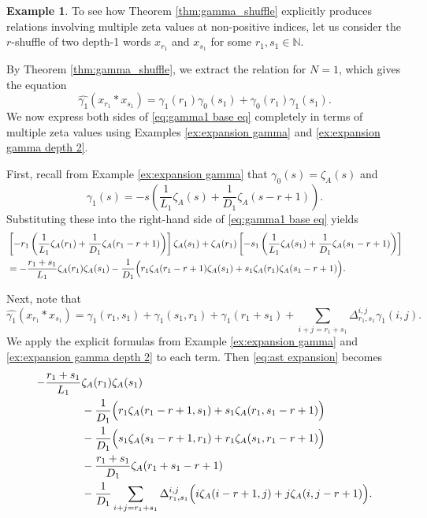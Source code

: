 \documentclass[12pt,reqno]{amsart}
\numberwithin{equation}{section}
\theoremstyle{plain}
\theoremstyle{definition}
\newtheorem{ex}[thm]{Example}
\theoremstyle{remark}
\newcommand{\NN}{\mathbb{N}}
\begin{document}
\begin{ex}\label{ex:gamma shuffle detailed}
To see how Theorem \ref{thm:gamma_shuffle} explicitly produces relations involving multiple zeta values at non-positive indices, let us consider the $r$-shuffle of two depth-1 words $x_{r_1}$ and $x_{s_1}$ for some $r_1,s_1\in\NN$. 

By Theorem \ref{thm:gamma_shuffle}, we extract the relation for $N=1$, which gives the equation
\begin{equation}\label{eq:gamma1 base eq}
    \widehat{\gamma_1}(x_{r_1} \ast x_{s_1}) = \gamma_1(r_1)\gamma_0(s_1) + \gamma_0(r_1)\gamma_1(s_1).
\end{equation}
We now express both sides of \eqref{eq:gamma1 base eq} completely in terms of multiple zeta values using Examples \ref{ex:expansion gamma} and \ref{ex:expansion gamma depth 2}.

First, recall from Example \ref{ex:expansion gamma} that $\gamma_0(s) = \zeta_A(s)$ and $$\gamma_1(s) = -s \left( \frac{1}{L_1} \zeta_A(s) + \frac{1}{D_1} \zeta_A(s-r+1) \right).$$ 
Substituting these into the right-hand side of \eqref{eq:gamma1 base eq} yields
\begin{align}
    \notag&\left[ -r_1 \left( \frac{1}{L_1} \zeta_A(r_1) + \frac{1}{D_1} \zeta_A(r_1-r+1) \right) \right] \zeta_A(s_1) + \zeta_A(r_1) \left[ -s_1 \left( \frac{1}{L_1} \zeta_A(s_1) + \frac{1}{D_1} \zeta_A(s_1-r+1) \right) \right] \\\label{eq:RHS}
    &= -\frac{r_1+s_1}{L_1} \zeta_A(r_1)\zeta_A(s_1) - \frac{1}{D_1} \Big( r_1\zeta_A(r_1-r+1)\zeta_A(s_1) + s_1\zeta_A(r_1)\zeta_A(s_1-r+1) \Big).
\end{align}

Next, note that
\begin{equation}\label{eq:ast expansion}
    \widehat{\gamma_1}(x_{r_1} \ast x_{s_1}) = \gamma_1(r_1, s_1) + \gamma_1(s_1, r_1) + \gamma_1(r_1+s_1) + \sum_{i+j=r_1+s_1}\Delta_{r_1,s_1}^{i,j}\gamma_1(i, j).
\end{equation}
We apply the explicit formulas from Example \ref{ex:expansion gamma} and \ref{ex:expansion gamma depth 2} to each term. Then \eqref{eq:ast expansion} becomes
\begin{align}
    \notag-\frac{r_1+s_1}{L_1} &\zeta_A(r_1)\zeta_A(s_1) \\\notag
    &- \frac{1}{D_1} \Big( r_1\zeta_A(r_1-r+1,s_1) + s_1\zeta_A(r_1,s_1-r+1) \Big) \\\notag
    &- \frac{1}{D_1} \Big( s_1\zeta_A(s_1-r+1,r_1) + r_1\zeta_A(s_1,r_1-r+1) \Big) \\\notag
    &- \frac{r_1+s_1}{D_1} \zeta_A(r_1+s_1-r+1) \\\label{eq:LHS}
    &- \frac{1}{D_1} \sum_{i+j=r_1+s_1} \Delta_{r_1,s_1}^{i,j} \Big( i\zeta_A(i-r+1,j) + j\zeta_A(i,j-r+1) \Big).
\end{align}


\end{ex}
\end{document}
